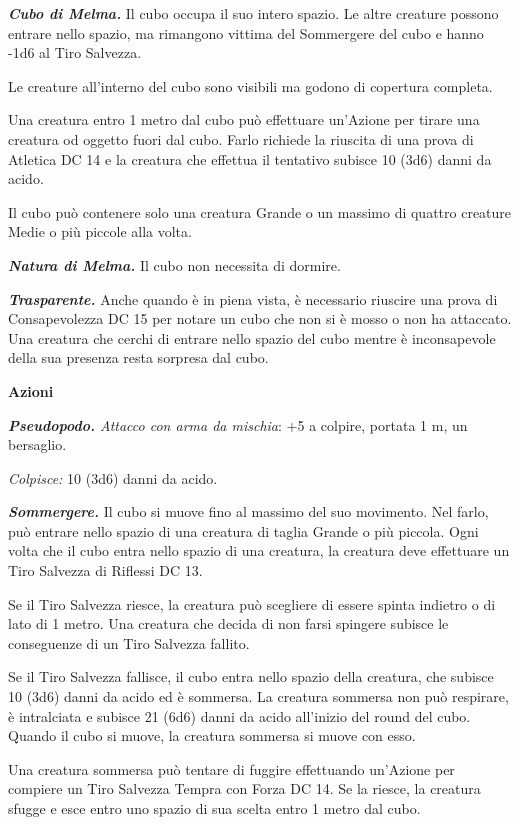 \begin{multicols}{2}
{\emph{\textbf{Cubo di Melma.}} Il cubo occupa il suo intero spazio. Le altre creature possono entrare nello spazio, ma rimangono vittima del Sommergere del cubo e hanno -1d6 al Tiro Salvezza.

Le creature all'interno del cubo sono visibili ma godono di copertura completa.

Una creatura entro 1 metro dal cubo può effettuare un'Azione per tirare una creatura od oggetto fuori dal cubo. Farlo richiede la riuscita di una prova di Atletica DC 14 e la creatura che effettua il tentativo subisce 10 (3d6) danni da acido.

Il cubo può contenere solo una creatura Grande o un massimo di quattro creature Medie o più piccole alla volta.

\emph{\textbf{Natura di Melma.}} Il cubo non necessita di dormire.

\emph{\textbf{Trasparente.}} Anche quando è in piena vista, è necessario riuscire una prova di Consapevolezza DC 15 per notare un cubo che non si è mosso o non ha attaccato. Una creatura che cerchi di entrare nello spazio del cubo mentre è inconsapevole della sua presenza resta sorpresa dal cubo.

\textbf{Azioni}

\emph{\textbf{Pseudopodo.} Attacco con arma da mischia}: +5 a colpire, portata 1 m, un bersaglio.

\emph{Colpisce:} 10 (3d6) danni da acido.

\emph{\textbf{Sommergere.}} Il cubo si muove fino al massimo del suo movimento. Nel farlo, può entrare nello spazio di una creatura di taglia Grande o più piccola. Ogni volta che il cubo entra nello spazio di una creatura, la creatura deve effettuare un Tiro Salvezza di Riflessi DC 13.

Se il Tiro Salvezza riesce, la creatura può scegliere di essere spinta indietro o di lato di 1 metro. Una creatura che decida di non farsi spingere subisce le conseguenze di un Tiro Salvezza fallito.

Se il Tiro Salvezza fallisce, il cubo entra nello spazio della creatura, che subisce 10 (3d6) danni da acido ed è sommersa. La creatura sommersa non può respirare, è intralciata e subisce 21 (6d6) danni da acido all'inizio del round del cubo. Quando il cubo si muove, la creatura sommersa si muove con esso.

Una creatura sommersa può tentare di fuggire effettuando un'Azione per compiere un Tiro Salvezza Tempra con Forza DC 14. Se la riesce, la creatura sfugge e esce entro uno spazio di sua scelta entro 1 metro dal cubo.

}
\end{multicols}
